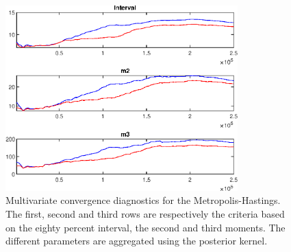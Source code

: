  
\begin{figure}[H]
\centering 
\includegraphics[width=0.8\textwidth]{directed_search/Output/directed_search_mdiag}
\caption{Multivariate convergence diagnostics for the Metropolis-Hastings.
The first, second and third rows are respectively the criteria based on
the eighty percent interval, the second and third moments. The different 
parameters are aggregated using the posterior kernel.}\label{Fig:MultivariateDiagnostics}
\end{figure}

